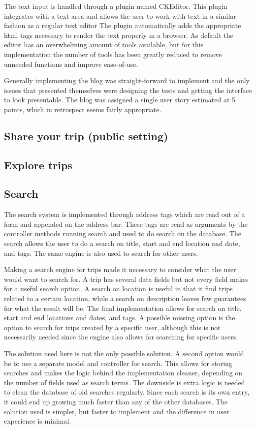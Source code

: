 \documentclass[a4paper]{article}
\begin{document}
The text input is handled through a plugin named CKEditor. This plugin integrates with a text area and allows the user to work with text in a similar fashion as a regular text editor The plugin automatically adds the appropriate html tags necessary to render the text properly in a browser. As default the editor has an overwhelming amount of tools available, but for this implementation the number of tools has been greatly reduced to remove unneeded functions and improve ease-of-use.

Generally implementing the blog was straight-forward to implement and the only issues that presented themselves were designing the tests and getting the interface to look presentable. The blog was assigned a single user story estimated at 5 points, which in retrospect seems fairly appropriate.
\subsection{Share your trip (public setting)}
\subsection{Explore trips}
\subsection{Search}
The search system is implemented through address tags which are read out of a form and appended on the address bar. These tags are read as arguments by the controller methods running search and used to do search on the database. The search allows the user to do a search on title, start and end location and date, and tags. The same engine is also used to search for other users.

Making a search engine for trips made it necessary to consider what the user would want to search for. A trip has several data fields but not every field makes for a useful search option. A search on location is useful in that it find trips related to a certain location, while a search on description leaves few guarantees for what the result will be. The final implementation allows for search on title, start and end locations and dates, and tags. A possible missing option is the option to search for trips created by a specific user, although this is not necessarily needed since the engine also allows for searching for specific users.

The solution used here is not the only possible solution. A second option would be to use a separate model and controller for search. This allows for storing searches and makes the logic behind the implementation cleaner, depending on the number of fields used as search terms. The downside is extra logic is needed to clean the database of old searches regularly. Since each search is its own entry, it could end up growing much faster than any of the other databases. The solution used is simpler, but faster to implement and the difference in user experience is minimal.
\end{document}
